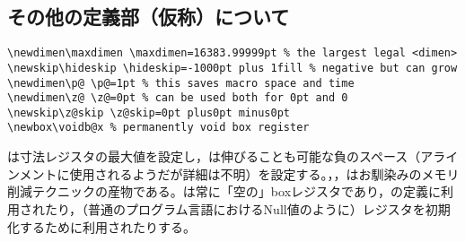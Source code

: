 \documentclass[autodetect-engine,dvipdfmx]{jsarticle}
\begin{document}
\subsection{その他の定義部（仮称）について}
\latexltx
\begin{lstlisting}[firstnumber=351]
\newdimen\maxdimen \maxdimen=16383.99999pt % the largest legal <dimen>
\newskip\hideskip \hideskip=-1000pt plus 1fill % negative but can grow
\newdimen\p@ \p@=1pt % this saves macro space and time
\newdimen\z@ \z@=0pt % can be used both for 0pt and 0
\newskip\z@skip \z@skip=0pt plus0pt minus0pt
\newbox\voidb@x % permanently void box register
\end{lstlisting}
は寸法レジスタの最大値を設定し，は伸びることも可能な負のスペース（アラインメントに使用されるようだが詳細は不明）を設定する。，，はお馴染みのメモリ削減テクニックの産物である。は常に「空の」boxレジスタであり，の定義に利用されたり，（普通のプログラム言語におけるNull値のように）レジスタを初期化するために利用されたりする。
\end{document}
